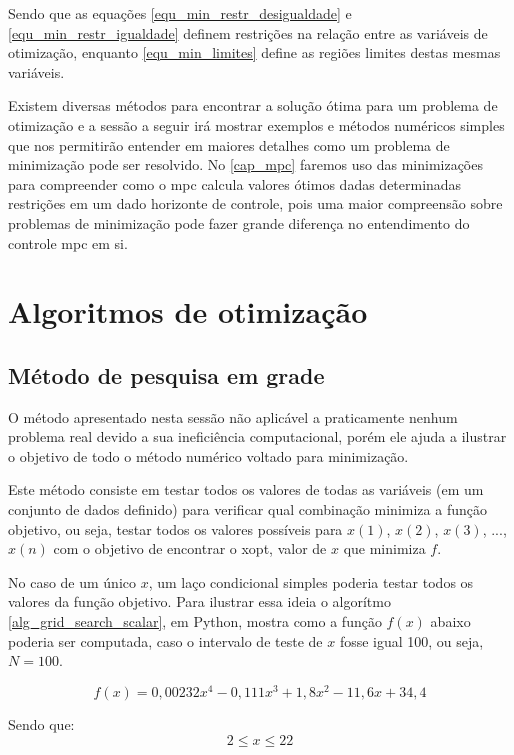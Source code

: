 Sendo que as equações \ref{equ_min_restr_desigualdade} e \ref{equ_min_restr_igualdade}
definem restrições na relação entre as variáveis de otimização, enquanto
\ref{equ_min_limites} define as regiões limites destas mesmas variáveis.

Existem diversas métodos para encontrar a solução ótima para um problema de otimização
e a sessão a seguir irá mostrar exemplos e métodos numéricos simples que nos permitirão
entender em maiores detalhes como um problema de minimização pode ser resolvido. No
\autoref{cap_mpc} faremos uso das minimizações para compreender como o \acrshort{mpc}
calcula valores ótimos dadas determinadas restrições em um dado horizonte de controle,
pois uma maior compreensão sobre problemas de minimização pode fazer grande diferença
no entendimento do controle \acrshort{mpc} em si.

\section{Algoritmos de otimização}

\subsection{Método de pesquisa em grade}

O método apresentado nesta sessão não aplicável a praticamente nenhum problema real
devido a sua ineficiência computacional, porém ele ajuda a ilustrar o objetivo de
todo o método numérico voltado para minimização.

Este método consiste em testar todos os valores de todas as variáveis (em um conjunto
de dados definido) para verificar qual combinação minimiza a função objetivo, ou seja,
testar todos os valores possíveis para $x(1)$, $x(2)$, $x(3)$, $...$, $x(n)$ com o
objetivo de encontrar o \gls{xopt}, valor de $x$ que minimiza $f$.

No caso de um único $x$, um laço condicional simples poderia testar todos os valores da
função objetivo. Para ilustrar essa ideia o algorítmo \ref{alg_grid_search_scalar}, em
Python, mostra como a função $f(x)$ abaixo poderia ser computada, caso o intervalo de
teste de $x$ fosse igual 100, ou seja, $N = 100$.

\begin{equation}
	\label{equ_grid_search_scalar}
	f(x) = 0,00232x^4 - 0,111x^3 + 1,8x^2 - 11,6x + 34,4
\end{equation}

Sendo que:
\[	2 \leq x \leq 22 \]

